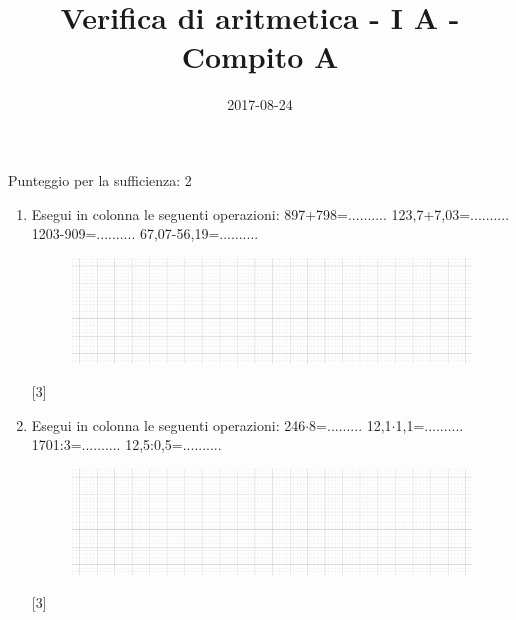 \documentclass[11pt,fleqn]{article} %
\title{Verifica di aritmetica - I A - Compito A}
\date{2017-08-24}
\newcommand{\T}{\cdot}
\begin{document}
\maketitle
Punteggio per la sufficienza: 2
\begin{enumerate}

\item Esegui in colonna le seguenti operazioni: 897+798=.......... 123,7+7,03=.......... 1203-909=.......... 67,07-56,19=..........
\begin{figure}[h]
	\centering
		\includegraphics[width=13cm]{figure/quadretti.png}
\end{figure}
 [3] 
\item Esegui in colonna le seguenti operazioni: 246$\T$8=......... 12,1$\T$1,1=.......... 1701:3=.......... 12,5:0,5=..........
\begin{figure}[h]
	\centering
		\includegraphics[width=13cm]{figure/quadretti.png}
\end{figure} [3] 
\end{enumerate}
\end{document}
